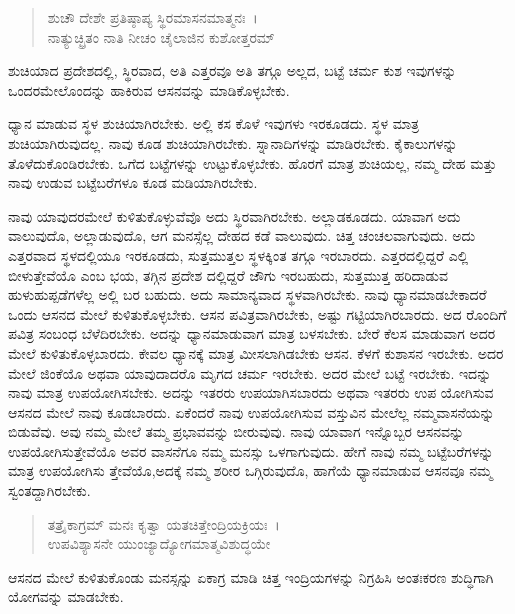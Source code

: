 \begin{verse}
ಶುಚೌ ದೇಶೇ ಪ್ರತಿಷ್ಠಾಪ್ಯ ಸ್ಥಿರಮಾಸನಮಾತ್ಮನಃ~।\\ನಾತ್ಯುಚ್ಛ್ರಿತಂ ನಾತಿ ನೀಚಂ ಚೈಲಾಜಿನ ಕುಶೋತ್ತರಮ್ 
\end{verse}

{\small ಶುಚಿಯಾದ ಪ್ರದೇಶದಲ್ಲಿ, ಸ್ಥಿರವಾದ, ಅತಿ ಎತ್ತರವೂ ಅತಿ ತಗ್ಗೂ ಅಲ್ಲದ, ಬಟ್ಟೆ ಚರ್ಮ ಕುಶ ಇವುಗಳನ್ನು ಒಂದರಮೇಲೊಂದನ್ನು ಹಾಕಿರುವ ಆಸನವನ್ನು ಮಾಡಿಕೊಳ್ಳಬೇಕು.}

ಧ್ಯಾನ ಮಾಡುವ ಸ್ಥಳ ಶುಚಿಯಾಗಿರಬೇಕು. ಅಲ್ಲಿ ಕಸ ಕೊಳೆ ಇವುಗಳು ಇರಕೂಡದು. ಸ್ಥಳ ಮಾತ್ರ ಶುಚಿಯಾಗಿರುವುದಲ್ಲ. ನಾವು ಕೂಡ ಶುಚಿಯಾಗಿರಬೇಕು. ಸ್ನಾನಾದಿಗಳನ್ನು ಮಾಡಿರಬೇಕು. ಕೈಕಾಲುಗಳನ್ನು ತೊಳೆದುಕೊಂಡಿರಬೇಕು. ಒಗೆದ ಬಟ್ಟೆಗಳನ್ನು ಉಟ್ಟುಕೊಳ್ಳಬೇಕು. ಹೊರಗೆ ಮಾತ್ರ ಶುಚಿಯಲ್ಲ, ನಮ್ಮ ದೇಹ ಮತ್ತು ನಾವು ಉಡುವ ಬಟ್ಟೆಬರೆಗಳೂ ಕೂಡ ಮಡಿಯಾಗಿರಬೇಕು.

ನಾವು ಯಾವುದರಮೇಲೆ ಕುಳಿತುಕೊಳ್ಳುವೆವೊ ಅದು ಸ್ಥಿರವಾಗಿರಬೇಕು. ಅಲ್ಲಾಡಕೂಡದು. ಯಾವಾಗ ಅದು ವಾಲುವುದೊ, ಅಲ್ಲಾಡುವುದೊ, ಆಗ ಮನಸ್ಸೆಲ್ಲ ದೇಹದ ಕಡೆ ವಾಲುವುದು. ಚಿತ್ತ ಚಂಚಲವಾಗುವುದು. ಅದು ಎತ್ತರವಾದ ಸ್ಥಳದಲ್ಲಿಯೂ ಇರಕೂಡದು, ಸುತ್ತಮುತ್ತಲ ಸ್ಥಳಕ್ಕಿಂತ ತಗ್ಗೂ ಇರಬಾರದು. ಎತ್ತರದಲ್ಲಿದ್ದರೆ ಎಲ್ಲಿ ಬೀಳುತ್ತೇವೆಯೊ ಎಂಬ ಭಯ, ತಗ್ಗಿನ ಪ್ರದೇಶ ದಲ್ಲಿದ್ದರೆ ಜೌಗು ಇರಬಹುದು, ಸುತ್ತಮುತ್ತ ಹರಿದಾಡುವ ಹುಳುಹುಪ್ಪಡೆಗಳೆಲ್ಲ ಅಲ್ಲಿ ಬರ ಬಹುದು. ಅದು ಸಾಮಾನ್ಯವಾದ ಸ್ಥಳವಾಗಿರಬೇಕು. ನಾವು ಧ್ಯಾನಮಾಡಬೇಕಾದರೆ ಒಂದು ಆಸನದ ಮೇಲೆ ಕುಳಿತುಕೊಳ್ಳಬೇಕು. ಆಸನ ಪವಿತ್ರವಾಗಿರಬೇಕು, ಅಷ್ಟು ಗಟ್ಟಿಯಾಗಿರಬಾರದು. ಅದ ರೊಂದಿಗೆ ಪವಿತ್ರ ಸಂಬಂಧ ಬೆಳೆದಿರಬೇಕು. ಅದನ್ನು ಧ್ಯಾನಮಾಡುವಾಗ ಮಾತ್ರ ಬಳಸಬೇಕು. ಬೇರೆ ಕೆಲಸ ಮಾಡುವಾಗ ಅದರ ಮೇಲೆ ಕುಳಿತುಕೊಳ್ಳಬಾರದು. ಕೇವಲ ಧ್ಯಾನಕ್ಕೆ ಮಾತ್ರ ಮೀಸಲಾಗಿಡಬೇಕು ಆಸನ. ಕೆಳಗೆ ಕುಶಾಸನ ಇರಬೇಕು. ಅದರ ಮೇಲೆ ಜಿಂಕೆಯೊ ಅಥವಾ ಯಾವುದಾದರೊ ಮೃಗದ ಚರ್ಮ ಇರಬೇಕು. ಅದರ ಮೇಲೆ ಬಟ್ಟೆ ಇರಬೇಕು. ಇದನ್ನು ನಾವು ಮಾತ್ರ ಉಪಯೋಗಿಸಬೇಕು. ಅದನ್ನು ಇತರರು ಉಪಯಾಗಿಸಬಾರದು ಅಥವಾ ಇತರರು ಉಪ ಯೋಗಿಸುವ ಆಸನದ ಮೇಲೆ ನಾವು ಕೂಡಬಾರದು. ಏಕೆಂದರೆ ನಾವು ಉಪಯೋಗಿಸುವ ವಸ್ತುವಿನ ಮೇಲೆಲ್ಲ ನಮ್ಮವಾಸನೆಯನ್ನು ಬಿಡುವೆವು. ಅವು ನಮ್ಮ ಮೇಲೆ ತಮ್ಮ ಪ್ರಭಾವವನ್ನು ಬೀರುವುವು. ನಾವು ಯಾವಾಗ ಇನ್ನೊಬ್ಬರ ಆಸನವನ್ನು ಉಪಯೋಗಿಸುತ್ತೇವೆಯೊ ಅವರ ವಾಸನೆಗೂ ನಮ್ಮ ಮನಸ್ಸು ಒಳಗಾಗುವುದು. ಹೇಗೆ ನಾವು ನಮ್ಮ ಬಟ್ಟೆಬರೆಗಳನ್ನು ಮಾತ್ರ ಉಪಯೋಗಿಸು ತ್ತೇವೆಯೊ,ಅದಕ್ಕೆ ನಮ್ಮ ಶರೀರ ಒಗ್ಗಿರುವುದೊ, ಹಾಗೆಯೆ ಧ್ಯಾನಮಾಡುವ ಆಸನವೂ ನಮ್ಮ ಸ್ವಂತದ್ದಾಗಿರಬೇಕು.

\begin{verse}
ತತ್ರೈಕಾಗ್ರಮ್ ಮನಃ ಕೃತ್ವಾ ಯತಚಿತ್ತೇಂದ್ರಿಯಕ್ರಿಯಃ~।\\ಉಪವಿಶ್ಯಾಸನೇ ಯುಂಜ್ಯಾದ್ಯೋಗಮಾತ್ಮವಿಶುದ್ಧಯೇ 
\end{verse}

{\small ಆಸನದ ಮೇಲೆ ಕುಳಿತುಕೊಂಡು ಮನಸ್ಸನ್ನು ಏಕಾಗ್ರ ಮಾಡಿ ಚಿತ್ತ ಇಂದ್ರಿಯಗಳನ್ನು ನಿಗ್ರಹಿಸಿ ಅಂತಃಕರಣ ಶುದ್ಧಿಗಾಗಿ ಯೋಗವನ್ನು ಮಾಡಬೇಕು.}

